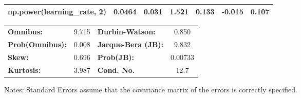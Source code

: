 \begin{center}
\begin{tabular}{lcccccc}
\textbf{np.power(learning\_rate, 2)}      &       0.0464  &        0.031     &     1.521  &         0.133        &       -0.015    &        0.107     \\
\bottomrule
\end{tabular}
\begin{tabular}{lclc}
\textbf{Omnibus:}       &  9.715 & \textbf{  Durbin-Watson:     } &    0.850  \\
\textbf{Prob(Omnibus):} &  0.008 & \textbf{  Jarque-Bera (JB):  } &    9.832  \\
\textbf{Skew:}          &  0.696 & \textbf{  Prob(JB):          } &  0.00733  \\
\textbf{Kurtosis:}      &  3.987 & \textbf{  Cond. No.          } &     12.7  \\
\bottomrule
\end{tabular}
\end{center}

Notes: \newline
 [1] Standard Errors assume that the covariance matrix of the errors is correctly specified.